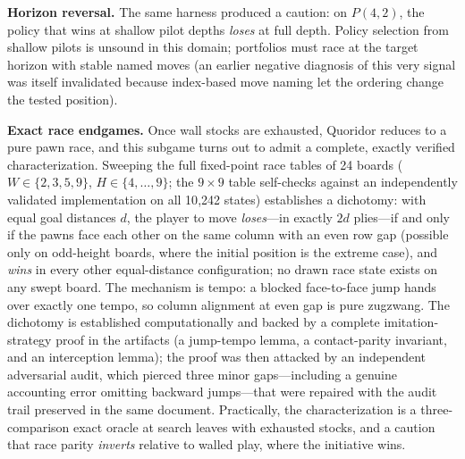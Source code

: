 \documentclass[conference]{IEEEtran}
\begin{document}
\textbf{Horizon reversal.} The same harness produced a caution: on $P(4,2)$, the policy that wins at shallow pilot depths \emph{loses} at full depth. Policy selection from shallow pilots is unsound in this domain; portfolios must race at the target horizon with stable named moves (an earlier negative diagnosis of this very signal was itself invalidated because index-based move naming let the ordering change the tested position).

\textbf{Exact race endgames.} Once wall stocks are exhausted, Quoridor reduces to a pure pawn race, and this subgame turns out to admit a complete, exactly verified characterization. Sweeping the full fixed-point race tables of 24 boards ($W\in\{2,3,5,9\}$, $H\in\{4,\dots,9\}$; the $9\times 9$ table self-checks against an independently validated implementation on all 10{,}242 states) establishes a dichotomy: with equal goal distances $d$, the player to move \emph{loses}---in exactly $2d$ plies---if and only if the pawns face each other on the same column with an even row gap (possible only on odd-height boards, where the initial position is the extreme case), and \emph{wins} in every other equal-distance configuration; no drawn race state exists on any swept board. The mechanism is tempo: a blocked face-to-face jump hands over exactly one tempo, so column alignment at even gap is pure zugzwang. The dichotomy is established computationally and backed by a complete imitation-strategy proof in the artifacts (a jump-tempo lemma, a contact-parity invariant, and an interception lemma); the proof was then attacked by an independent adversarial audit, which pierced three minor gaps---including a genuine accounting error omitting backward jumps---that were repaired with the audit trail preserved in the same document. Practically, the characterization is a three-comparison exact oracle at search leaves with exhausted stocks, and a caution that race parity \emph{inverts} relative to walled play, where the initiative wins.
\end{document}
